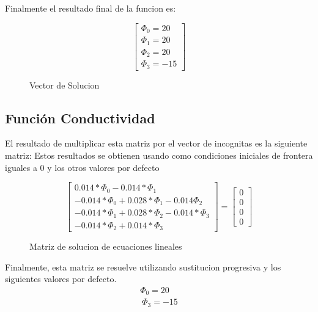 \documentclass{article}
\begin{document}
Finalmente el resultado final de la funcion es:

\begin{figure}[!h]
    
    \[
        \begin{bmatrix}
            {\Phi_0 = 20}\\
            {\Phi_1 = 20}\\
            {\Phi_2 = 20}\\
            {\Phi_3 = -15}
        \end{bmatrix}
    \]
    \caption{Vector de Solucion}
\end{figure}

\subsection{Función Conductividad}

El resultado de multiplicar esta matriz por el vector de incognitas es la siguiente matriz:
Estos resultados se obtienen usando como condiciones iniciales de frontera iguales a 0 y los otros valores por defecto
\begin{figure}[!h]
    \[
        \begin{bmatrix}
            {0.014*\Phi_0 - 0.014*\Phi_1}\\
            {-0.014*\Phi_0 + 0.028*\Phi_1-0.014\Phi_2}\\
            {-0.014*\Phi_1 + 0.028*\Phi_2 - 0.014*\Phi_3}\\
            {-0.014*\Phi_2 + 0.014*\Phi_3}
        \end{bmatrix}
        =
        \begin{bmatrix}
            {0}\\
            {0}\\
            {0}\\
            {0}
        \end{bmatrix}
    \]
    \caption{Matriz de solucion de ecuaciones lineales}
    \end{figure}
Finalmente, esta matriz se resuelve utilizando sustitucion progresiva y los siguientes valores por defecto.
\begin{gather}
        \Phi_0 = 20\\\
        \Phi_3 = -15
\end{gather}
\end{document}
